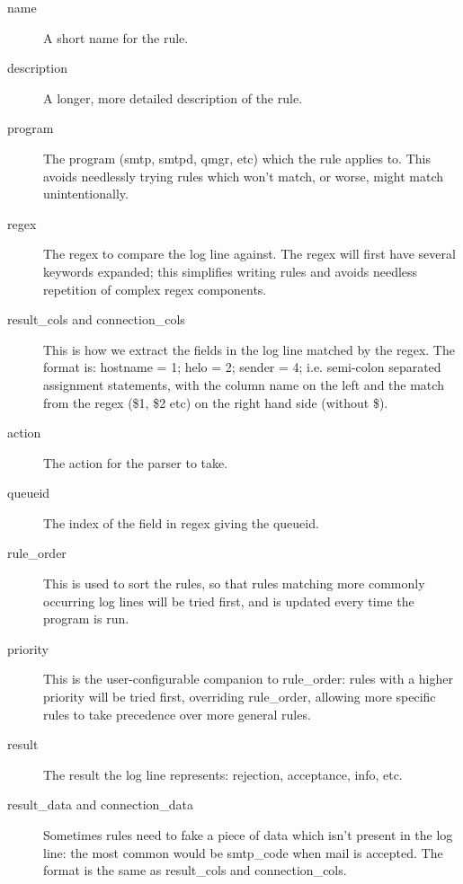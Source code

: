 \documentclass[a4paper,12pt,draft]{article}
\begin{document}
\begin{description}

    \item [name] A short name for the rule.

    \item [description] A longer, more detailed description of the rule.

    \item [program] The program (smtp, smtpd, qmgr, etc) which the rule
        applies to.  This avoids needlessly trying rules which won't
        match, or worse, might match unintentionally.

    \item [regex] The regex to compare the log line against.  The regex
        will first have several keywords expanded; this simplifies writing
        rules and avoids needless repetition of complex regex components.

    \item [result\_cols and connection\_cols] This is how we extract the
        fields in the log line matched by the regex.  The format is:
        \newline 
        hostname = 1; helo = 2; sender = 4; \newline
        i.e. semi-colon separated assignment statements, with the column
        name on the left and the match from the regex (\$1, \$2 etc) on the
        right hand side (without \$).

    \item [action] The action for the parser to take.

    \item [queueid] The index of the field in regex giving the queueid.

    \item [rule\_order] This is used to sort the rules, so that rules
        matching more commonly occurring log lines will be tried first, and
        is updated every time the program is run.

    \item [priority] This is the user-configurable companion to
        rule\_order: rules with a higher priority will be tried first,
        overriding rule\_order, allowing more specific rules to take
        precedence over more general rules.

    \item [result]  The result the log line represents: rejection,
        acceptance, info, etc.

    \item [result\_data and connection\_data] Sometimes rules need to fake
        a piece of data which isn't present in the log line: the most
        common would be smtp\_code when mail is accepted.  The format is
        the same as result\_cols and connection\_cols.

\end{description}
\end{document}
